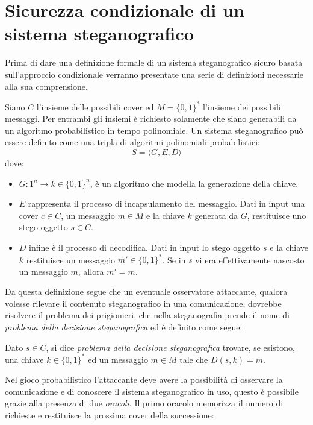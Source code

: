 		\section{Sicurezza condizionale di un sistema steganografico} 
		Prima di dare una definizione formale di un sistema steganografico sicuro basata sull'approccio condizionale verranno presentate una serie di definizioni necessarie alla sua comprensione.
				\begin{defn}
				Siano $C$ l'insieme delle possibili cover ed $M = \lbrace 0,1 \rbrace ^*$ l'insieme dei possibili messaggi. Per entrambi gli insiemi è richiesto solamente che siano generabili da un algoritmo probabilistico in tempo polinomiale. Un sistema steganografico può essere definito come una tripla di algoritmi polinomiali probabilistici:
				\[S=\langle G,E,D\rangle\]
dove:
			\begin{itemize}
			\item $G: 1^n \rightarrow k \in \lbrace 0,1 \rbrace ^n$, è un algoritmo che modella la generazione della chiave. 
			\item $E$ rappresenta il processo di incapsulamento del messaggio. Dati in input una cover $c \in C$, un messaggio $m \in M$ e la chiave $k$ generata da $G$, restituisce uno stego-oggetto $s \in C$.
			\item $D$ infine è il processo di decodifica. Dati in input lo stego oggetto $s$ e la chiave $k$ restituisce un messaggio $m' \in \lbrace 0,1 \rbrace ^*$. Se in $s$ vi era effettivamente nascosto un messaggio $m$, allora $m' = m$.
			\end{itemize}
		\end{defn} 
		\noindent Da questa definizione segue che un eventuale osservatore attaccante, qualora volesse rilevare il contenuto steganografico in una comunicazione, dovrebbe risolvere il problema dei prigionieri, che nella steganografia prende il nome di \textit{problema della decisione steganografica} ed è definito come segue:
	\begin{defn}
	Dato $s \in C$, si dice \textit{problema della decisione steganografica} trovare, se esistono, una chiave $k \in \lbrace 0,1 \rbrace ^*$ ed un messaggio $m \in M$ tale che $D(s,k) = m$. 
	\end{defn}
	\noindent Nel gioco probabilistico l'attaccante deve avere la possibilità di osservare la comunicazione e di conoscere il sistema steganografico in uso, questo è possibile grazie alla presenza di due \textit{oracoli}. Il primo oracolo memorizza il numero di richieste e restituisce la prossima cover della successione:
